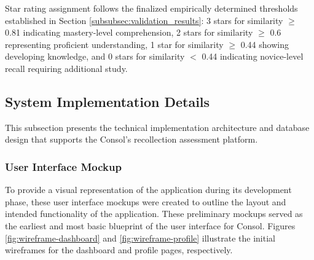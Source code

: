{Star rating assignment follows the finalized empirically determined thresholds established in Section \ref{subsubsec:validation_results}: 3 stars for similarity $\geq$ 0.81 indicating mastery-level comprehension, 2 stars for similarity $\geq$ 0.6 representing proficient understanding, 1 star for similarity $\geq$ 0.44 showing developing knowledge, and 0 stars for similarity $<$ 0.44 indicating novice-level recall requiring additional study.

\subsection{System Implementation Details}

This subsection presents the technical implementation architecture and database design that supports the Consol's recollection assessment platform.











\subsubsection{User Interface Mockup}

To provide a visual representation of the application during its development phase, these user interface mockups were created to outline the layout and intended functionality of the application. These preliminary mockups served as the earliest and most basic blueprint of the user interface for Consol. Figures \ref{fig:wireframe-dashboard} and \ref{fig:wireframe-profile} illustrate the initial wireframes for the dashboard and profile pages, respectively.


}
